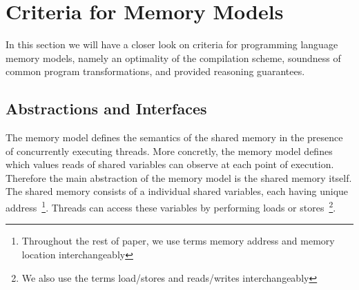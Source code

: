 \section{Criteria for Memory Models}
\label{sec:background}

In this section we will have a closer look on criteria for 
programming language memory models, 
namely an optimality of the compilation scheme, 
soundness of common program transformations, 
and provided reasoning guarantees.  

\subsection{Abstractions and Interfaces}
\label{sec:background-primitives}


The memory model defines the semantics of the shared memory 
in the presence of concurrently executing threads. 
More concretly, the memory model 
defines which values reads of shared variables 
can observe at each point of execution. 
Therefore the main abstraction of the memory model 
is the shared memory itself. 
The shared memory consists of a individual shared variables, 
each having unique address~\footnote{
Throughout the rest of paper, we use terms 
memory address and memory location interchangeably}.
Threads can access these variables by performing 
loads or stores~\footnote{We also use the terms 
load/stores and reads/writes interchangeably}.

